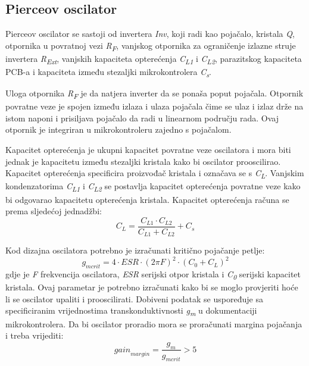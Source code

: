 \subsection{Pierceov oscilator}
Pierceov oscilator se sastoji od invertera \textit{Inv}, koji radi kao pojačalo, kristala \textit{Q}, otpornika u povratnoj vezi \textit{R\textsubscript{F}}, vanjskog otpornika za ograničenje izlazne struje invertera \textit{R\textsubscript{Ext}}, vanjskih kapaciteta opterećenja \textit{C\textsubscript{L1}} i \textit{C\textsubscript{L2}}, parazitskog kapaciteta PCB-a i kapaciteta između stezaljki mikrokontrolera \textit{C\textsubscript{s}}.

Uloga otpornika \textit{R\textsubscript{F}} je da natjera inverter da se ponaša poput pojačala. Otpornik povratne veze je spojen između izlaza i ulaza pojačala čime se ulaz i izlaz drže na istom naponi i prisiljava pojačalo da radi u linearnom području rada. Ovaj otpornik je integriran u mikrokontroleru zajedno s pojačalom.

Kapacitet opterećenja je ukupni kapacitet povratne veze oscilatora i mora biti jednak je kapacitetu između stezaljki kristala kako bi oscilator prooscilirao. Kapacitet opterećenja specificira proizvođač kristala i označava se s \textit{C\textsubscript{L}}. Vanjskim kondenzatorima \textit{C\textsubscript{L1}} i \textit{C\textsubscript{L2}} se postavlja kapacitet opterećenja povratne veze kako bi odgovarao kapacitetu opterećenja kristala. Kapacitet opterećenja računa se prema sljedećoj jednadžbi:
\begin{equation} \label{eq:CLOAD}
    C_L=\frac{C_{L1}\cdot C_{L2}}{C_{L1}+C_{L2}}+C_s
\end{equation}

Kod dizajna oscilatora potrebno je izračunati kritično pojačanje petlje:
\begin{equation} \label{eq:GMCRIT}
    g_{mcrit}=4\cdot ESR \cdot {(2\pi F)}^2\cdot {(C_0 + C_L)}^2
\end{equation}
gdje je \textit{F} frekvencija oscilatora, \textit{ESR} serijski otpor kristala i \textit{C\textsubscript{0}} serijski kapacitet kristala. Ovaj parametar je potrebno izračunati kako bi se moglo provjeriti hoće li se oscilator upaliti i prooscilirati. Dobiveni podatak se uspoređuje sa specificiranim vrijednostima transkonduktivnosti \textit{g\textsubscript{m}} u dokumentaciji mikrokontrolera. Da bi oscilator proradio mora se proračunati margina pojačanja i treba vrijediti:
\begin{equation} \label{eq:GMARGIN}
    {gain}_{margin}=\frac{g_m}{g_{mcrit}}>5
\end{equation}

